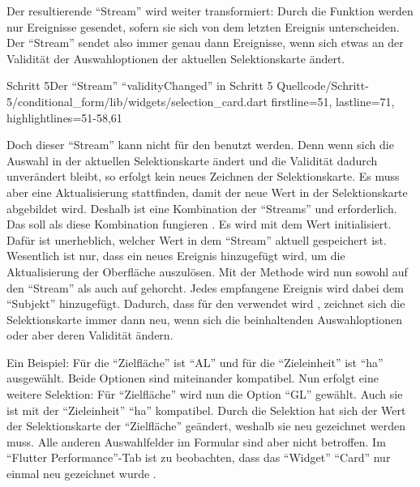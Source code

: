 Der resultierende \enquote{Stream} wird weiter transformiert: Durch die Funktion   werden nur Ereignisse gesendet,
sofern sie sich von dem letzten Ereignis unterscheiden.
Der \enquote{Stream}  sendet also immer genau dann Ereignisse,
wenn sich etwas an der Validität der Auswahloptionen der aktuellen Selektionskarte ändert.

\begin{alexlisting}{Schritt 5}{Der \enquote{Stream} \enquote{validityChanged} in Schritt 5}
  {Quellcode/Schritt-5/conditional_form/lib/widgets/selection_card.dart}
  {firstline=51, lastline=71, highlightlines={51-58,61}}
  \label{lst:Schritt5needsRepaint}
\end{alexlisting} 

Doch dieser \enquote{Stream} kann nicht für den  benutzt werden.
Denn wenn sich die Auswahl in der aktuellen Selektionskarte ändert
und die Validität dadurch unverändert bleibt,
so erfolgt kein neues Zeichnen der Selektionskarte.
Es muss aber eine Aktualisierung stattfinden, damit der neue Wert in der Selektionskarte abgebildet wird.
Deshalb ist eine Kombination der \enquote{Streams}  und  erforderlich.
Das   soll als diese Kombination fungieren .
Es wird mit dem Wert  initialisiert.
Dafür ist unerheblich, welcher Wert in dem \enquote{Stream} aktuell gespeichert ist.
Wesentlich ist nur, dass ein neues Ereignis hinzugefügt wird,
um die Aktualisierung der Oberfläche auszulösen.
Mit der Methode  wird nun sowohl auf den \enquote{Stream}   als auch auf   gehorcht. 
Jedes empfangene Ereignis wird dabei dem \enquote{Subjekt}  hinzugefügt.
Dadurch,
dass  für den  verwendet wird ,
zeichnet sich die Selektionskarte immer dann neu,
wenn sich die beinhaltenden Auswahloptionen oder aber deren Validität ändern.


Ein Beispiel:
Für die \enquote{Zielfläche} ist \enquote{AL} und für die \enquote{Zieleinheit} ist \enquote{ha} ausgewählt.
Beide Optionen sind miteinander kompatibel.
Nun erfolgt eine weitere Selektion:
Für \enquote{Zielfläche} wird nun die Option \enquote{GL} gewählt.
Auch sie ist mit der \enquote{Zieleinheit} \enquote{ha} kompatibel.
Durch die Selektion hat sich der Wert der Selektionskarte der \enquote{Zielfläche} geändert, weshalb sie neu gezeichnet werden muss.
Alle anderen Auswahlfelder im Formular sind aber nicht betroffen.
Im \enquote{Flutter Performance}-Tab ist zu beobachten,
dass das \enquote{Widget} \enquote{Card} nur einmal neu gezeichnet wurde \Abb{\ref{fig:Schritt5_1rebuild}}.
\clearpage

